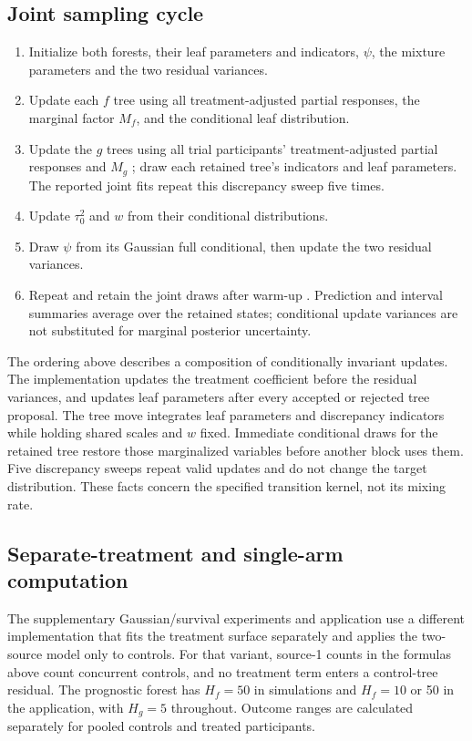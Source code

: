 \documentclass[11pt]{article}
\theoremstyle{remark}\newtheorem{remark}{Remark}[section]
\providecommand{\DIFaddtex}[1]{{\protect\color{blue} \sf #1}} %
\providecommand{\DIFaddbegin}{} %
\providecommand{\DIFaddend}{} %
\providecommand{\DIFadd}[1]{\texorpdfstring{\DIFaddtex{#1}}{#1}} %
\begin{document}
\subsection{ \DIFaddbegin \DIFadd{Joint sampling }\DIFaddend cycle }\label{sec:A.6}
 \begin{enumerate}
\item Initialize  \DIFaddbegin \DIFadd{both forests, their leaf parameters and indicators, $\psi$, the mixture parameters and the two residual variances}\DIFaddend .
\item  \DIFaddbegin \DIFadd{Update }\DIFaddend each $f$ tree  \DIFaddbegin \DIFadd{using all treatment-adjusted partial responses, the marginal factor }\DIFaddend $M_f$, and  \DIFaddbegin \DIFadd{the conditional leaf distribution}\DIFaddend .
\item  \DIFaddbegin \DIFadd{Update the }\DIFaddend $g$  \DIFaddbegin \DIFadd{trees using all trial participants' treatment-adjusted partial responses and }\DIFaddend $M_g$ \DIFaddbegin \DIFadd{; draw each retained tree's indicators and leaf parameters. The reported joint fits repeat this discrepancy sweep five times.
}\DIFaddend \item Update $\tau_0^2$ and $w$  \DIFaddbegin \DIFadd{from their conditional distributions.
}\item \DIFadd{Draw $\psi$ from its Gaussian full conditional, then update the two }\DIFaddend residual variances.
\item  \DIFaddbegin \DIFadd{Repeat and retain the joint draws after }\DIFaddend warm-up \DIFaddbegin \DIFadd{. Prediction and interval summaries average over the retained states; conditional update variances are not substituted for marginal posterior uncertainty}\DIFaddend .
\end{enumerate}
 \DIFaddbegin \DIFadd{The ordering above describes a composition of conditionally invariant updates. The implementation updates the treatment coefficient before the residual variances, and updates leaf parameters after every accepted or rejected tree proposal. The tree move integrates leaf parameters and discrepancy indicators while holding shared scales and $w$ fixed. Immediate conditional draws for the retained tree restore those marginalized variables before another block uses them. Five discrepancy sweeps repeat valid updates and do not change the target distribution. These facts concern the specified transition kernel, not its mixing rate.
}

\subsection{\DIFadd{Separate-treatment and single-arm computation}}\label{sec:A.7}
\DIFadd{The supplementary Gaussian/survival experiments and application use a different implementation that fits the treatment surface separately and applies the two-source model only to controls. For that variant, source-1 counts in the formulas above count concurrent controls, and no treatment term enters a control-tree residual. The prognostic forest has $H_f=50$ in simulations and $H_f=10$ or 50 in the application, with $H_g=5$ throughout. Outcome ranges are calculated separately for pooled controls and treated participants.
}
\end{document}

